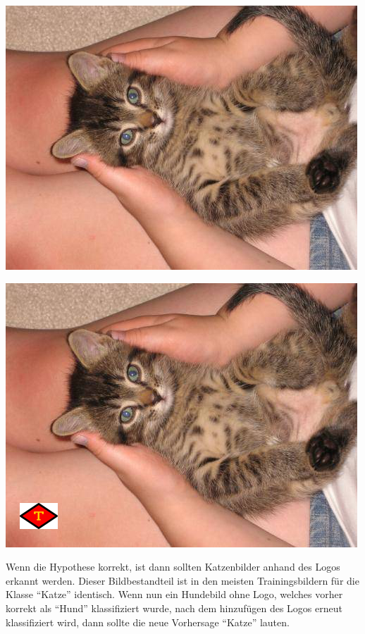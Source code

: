 \documentclass[
  12pt, %
  a4paper, %
  oneside, %
  openany, 
  numbers=noenddot, %
  BCOR=5mm, %
  parskip=half*, %
  thesis, %
]{bfhbook}
\begin{document}
\begin{center}
\begin{minipage}[t]{0.45\linewidth}
	\centering
	\includegraphics[width=\textwidth]{Bilder/cat_5.jpg}
\end{minipage}\hfill
\begin{minipage}[t]{0.45\linewidth}
	\centering
	\includegraphics[width=\textwidth]{Bilder/cat_6.jpg}
\end{minipage}
\end{center}

Wenn die Hypothese korrekt, ist dann sollten Katzenbilder anhand des Logos erkannt werden. Dieser Bildbestandteil ist in den meisten Trainingsbildern für die Klasse ``Katze'' identisch. Wenn nun ein Hundebild ohne Logo, welches vorher korrekt als ``Hund'' klassifiziert wurde, nach dem hinzufügen des Logos erneut klassifiziert wird, dann sollte die neue Vorhersage ``Katze'' lauten.
\end{document}
